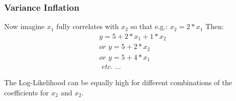 \documentclass{beamer}
\begin{document}

\begin{frame}
      \frametitle{Variance Inflation}
    Now imagine $x_1$ fully correlates with $x_2$ so that e.g.: $x_2 = 2 * x_1$ Then:
    \begin{equation*}
        \begin{aligned}
        y = 5 + 2 * x_1 + 1 * x_2 \\
        \textit{or } y = 5 + 2 * x_2 \\
        \textit{or } y = 5 + 4 * x_1 \\
        \textit{ etc. ...}
        \end{aligned}
    \end{equation*}
    \vspace{0.5cm}
    
    The Log-Likelihood can be equally high for different combinations of the coefficients for $x_2$ and $x_2$.
\end{frame}
\end{document}
